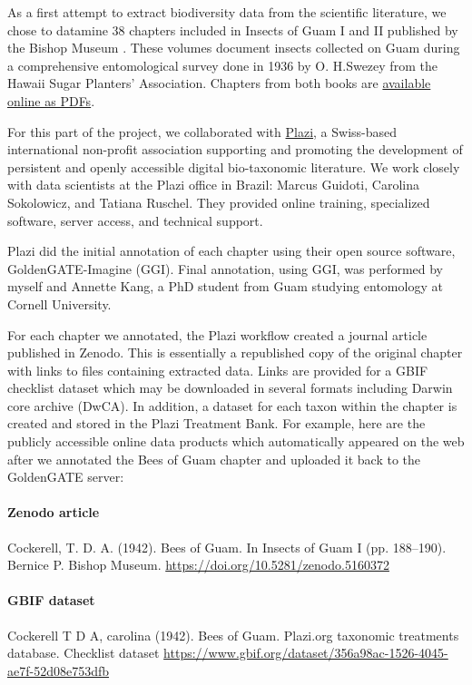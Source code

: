 \documentclass[12pt,letterpaper,english,bibliography=totocnumbered, abstract=on]{scrartcl}
\begin{document}
As a first attempt to extract biodiversity data from the scientific literature, we chose to datamine 38 chapters included in Insects of Guam I and II published by the Bishop Museum \cite{swezey1942insects, swezey1946insects}. These volumes document insects collected on Guam during a comprehensive entomological survey done in 1936 by O. H.Swezey from the Hawaii Sugar Planters' Association. Chapters from both books are \href{http://hbs.bishopmuseum.org/pubs-online/bpbm-bulletins.html}{available online as PDFs}.

For this part of the project, we collaborated with \href{https://en.wikipedia.org/wiki/Plazi}{Plazi}, a Swiss-based international non-profit association supporting and promoting the development of persistent and openly accessible digital bio-taxonomic literature. We work closely with data scientists at the Plazi office in Brazil: Marcus Guidoti, Carolina Sokolowicz, and Tatiana Ruschel. They provided online training, specialized software, server access, and technical support.

Plazi did the initial annotation of each chapter using their open source software, GoldenGATE-Imagine (GGI). Final annotation, using GGI, was performed by myself and Annette Kang, a PhD student from Guam studying entomology at Cornell University.

For each chapter we annotated, the Plazi workflow created a journal article published in Zenodo. This is essentially a republished copy of the original chapter with links to files containing extracted data. Links are provided for a GBIF checklist dataset which may be downloaded in several formats including Darwin core archive (DwCA). In addition, a dataset for each taxon within the chapter is created and stored in the Plazi Treatment Bank. For example, here are the publicly accessible online data products which automatically appeared on the web after we annotated the Bees of Guam chapter and uploaded it back to the GoldenGATE server:

\paragraph{Zenodo article} Cockerell, T. D. A. (1942). Bees of Guam. In Insects of Guam I (pp. 188–190). Bernice P. Bishop Museum. \url{https://doi.org/10.5281/zenodo.5160372}

\paragraph{GBIF dataset} Cockerell T D A, carolina (1942). Bees of Guam. Plazi.org taxonomic treatments database. Checklist dataset \url{https://www.gbif.org/dataset/356a98ac-1526-4045-ae7f-52d08e753dfb} 
\end{document}
